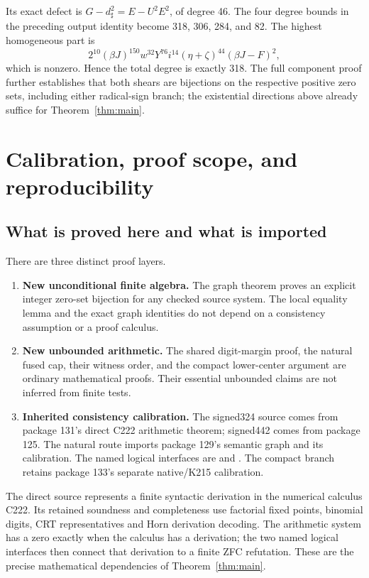 \documentclass[11pt,letterpaper]{article}
\theoremstyle{definition}\newtheorem{definition}[theorem]{Definition}
\theoremstyle{remark}\newtheorem{remark}[theorem]{Remark}
\begin{document}
Its exact defect is \(G-d_\sharp^2=E-U^2E^2\), of degree 46.
The four degree bounds in the preceding output identity become
318, 306, 284, and 82. The highest homogeneous part is
\[
 2^{10}(\beta J)^{150}w^{32}Y^{76}i^{14}
             (\eta+\zeta)^{44}(\beta J-F)^2,
\]
which is nonzero. Hence the total degree is exactly 318. The full
component proof further establishes that both shears are bijections
on the respective positive zero sets, including either radical-sign
branch; the existential directions above already suffice for
Theorem~\ref{thm:main}.

\section{Calibration, proof scope, and reproducibility}
\label{sec:calibration}

\subsection{What is proved here and what is imported}

There are three distinct proof layers.
\begin{enumerate}
\item \textbf{New unconditional finite algebra.} The graph theorem proves
an explicit integer zero-set bijection for any checked source system.
The local equality lemma and the exact graph identities do not depend
on a consistency assumption or a proof calculus.
\item \textbf{New unbounded arithmetic.} The shared digit-margin proof,
the natural fused cap, their witness order, and the compact lower-center
argument are ordinary mathematical proofs. Their essential unbounded
claims are not inferred from finite tests.
\item \textbf{Inherited consistency calibration.} The signed324 source
comes from package 131's direct C222 arithmetic theorem; signed442 comes
from package 125. The natural route imports package 129's semantic graph
and its calibration. The named logical interfaces are
 and
.
The compact branch retains package 133's separate native/K215 calibration.
\end{enumerate}

The direct source represents a finite syntactic derivation in the
numerical calculus C222. Its retained soundness and completeness use
factorial fixed points, binomial digits, CRT representatives and Horn
derivation decoding. The arithmetic system has a zero exactly when the
calculus has a derivation; the two named logical interfaces then connect
that derivation to a finite ZFC refutation. These are the precise
mathematical dependencies of Theorem~\ref{thm:main}.
\end{document}
